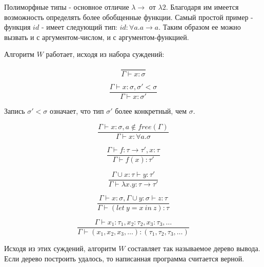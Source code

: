 Полиморфные типы - основное отличие $\lambda \to$ от $\lambda 2$.
Благодаря им имеется возможность определять более обобщенные функции.
Самый простой пример - функция $id$ - имеет следующий тип: $id: \forall a. a \to a$.
Таким образом ее можно вызвать и с аргументом-числом, и с аргументом-функцией.

Алгоритм $W$ работает, исходя из набора суждений:

\begin{equation}
    \label{eq:taut}
    \tag{TAUT}
    \frac{}{\Gamma \vdash x: \sigma}
\end{equation}

\begin{equation}
    \label{eq:inst}
    \tag{INST}
    \frac{\Gamma \vdash x: \sigma, \sigma' < \sigma}{\Gamma \vdash x: \sigma'}
\end{equation}

Запись $\sigma' < \sigma$ означает, что тип $\sigma'$ более конкретный, чем $\sigma$.

\begin{equation}
    \label{eq:gen}
    \tag{GEN}
    \frac{\Gamma \vdash x: \sigma, a \notin free(\Gamma)}{\Gamma \vdash x: \forall a. \sigma}
\end{equation}

\begin{equation}
    \label{eq:comb}
    \tag{COMB}
    \frac{\Gamma \vdash f: \tau \to \tau', x: \tau}{\Gamma \vdash f(x): \tau'}
\end{equation}

\begin{equation}
    \label{eq:abs}
    \tag{ABS}
    \frac{\Gamma \cup x: \tau \vdash y: \tau'}{\Gamma \vdash \lambda x. y : \tau \to \tau'}
\end{equation}

\begin{equation}
    \label{eq:let}
    \tag{LET}
    \frac{\Gamma \vdash x: \sigma, \Gamma \cup y: \sigma \vdash z: \tau}{\Gamma \vdash (let ~ y = x ~ in ~ z): \tau}
\end{equation}

\begin{equation}
    \label{eq:tuple}
    \tag{TUPLE}
    \frac{\Gamma \vdash x_1: \tau_1, x_2: \tau_2, x_3: \tau_3, \ldots}{\Gamma \vdash (x_1, x_2, x_3, \ldots): (\tau_1, \tau_2, \tau_3, \ldots)}
\end{equation}

Исходя из этих суждений, алгоритм $W$ составляет так называемое дерево вывода.
Если дерево построить удалось, то написанная программа считается верной.


